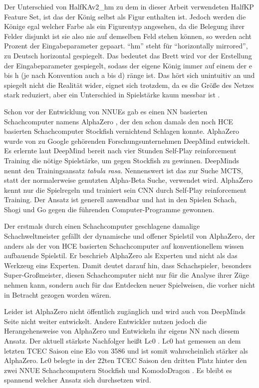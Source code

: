 Der Unterschied von HalfKAv2\_hm zu dem in dieser Arbeit verwendeten HalfKP Feature Set, ist das der König selbst als Figur enthalten ist. Jedoch werden die Könige egal welcher Farbe als ein Figurentyp angesehen, da die Belegung ihrer Felder disjunkt ist sie also nie auf demselben Feld stehen können, so werden acht Prozent der Eingabeparameter gepaart. \enquote{hm} steht für \enquote{horizontally mirrored}, zu Deutsch horizontal gespiegelt. Das bedeutet das Brett wird vor der Erstellung der Eingabeparameter gespiegelt, sodass der eigene König immer auf einem der e bis h (je nach Konvention auch a bis d) ränge ist. Das hört sich unintuitiv an und spiegelt nicht die Realität wider, eignet sich trotzdem, da es die Größe des Netzes stark reduziert, aber ein Unterschied in Spielstärke kaum messbar ist \cite{StockfishNNUE}.

Schon vor der Entwicklung von \acp{NNUE} gab es einen \ac{NN} basierten Schachcomputer namens AlphaZero \cite{Silver2017}, der den schon damals den noch \ac{HCE} basierten Schachcomputer Stockfish vernichtend Schlagen konnte. AlphaZero wurde \citeyear{Silver2017} von zu Google gehörenden Forschungsunternehmen DeepMind entwickelt. Es erlernte laut DeepMind bereit nach vier Stunden Self-Play reinforcement Training die nötige Spielstärke, um gegen Stockfish zu gewinnen. DeepMinds nennt den Trainingsansatz \emph{tabula rasa}. Nennenswert ist das zur Suche \ac{MCTS}, statt der normalerweise genutzten Alpha-Beta Suche, verwendet wird. AlphaZero kennt nur die Spielregeln und trainiert sein \ac{CNN} durch Self-Play reinforcement Training. Der Ansatz ist generell anwendbar und hat in den Spielen Schach, Shogi und Go gegen die führenden Computer-Programme gewonnen.

Der erstmals durch einen Schachcomputer geschlagene damalige Schachweltmeister \citeauthor{Kasparov2018} \cite{Kasparov2018} gefällt der dynamische und offener Spielstil von AlphaZero, der anders als der von \ac{HCE} basierten Schachcomputer auf konventionellem wissen aufbauende Spielstil. Er beschrieb AlphaZero als Experten und nicht als das Werkzeug eins Experten. Damit deutet \citeauthor{Kasparov2018} darauf hin, dass Schachspieler, besonders Super-Großmeister, diesen Schachcomputer nicht nur für die Analyse ihrer Züge nehmen kann, sondern auch für das Entdecken neuer Spielweisen, die vorher nicht in Betracht gezogen worden wären.

Leider ist AlphaZero nicht öffentlich zugänglich und wird auch von DeepMinds Seite nicht weiter entwickelt. Andere Entwickler nutzen jedoch die Herangehensweise von AlphaZero und Entwickeln ihr eigens \ac{NN} nach diesem Ansatz. Der aktuell stärkste Nachfolger heißt \ac{Lc0} \cite{Lc0Homepage}. \ac{Lc0} hat gemessen an dem letzten \ac{TCEC} Saison eine Elo von 3586 \cite{TCEC22} und ist somit wahrscheinlich stärker als AlphaZero. \ac{Lc0} belegte in der 22ten \ac{TCEC} Saison den dritten Platz hinter den zwei \ac{NNUE} Schachcomputern Stockfish und KomodoDragon \cite{KomodoDragon}. Es bleibt es spannend welcher Ansatz sich durchsetzen wird.